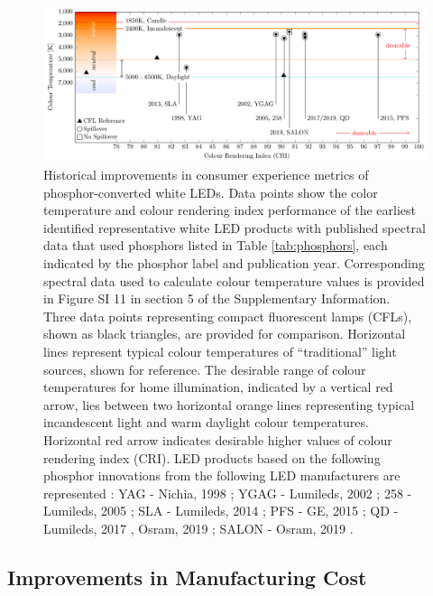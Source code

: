 \documentclass[twoside,twocolumn,9pt]{article}
\begin{document}
\begin{figure}[h!]
 \centering
 \includegraphics[width=\textwidth]{2_SSL_EES/article/figures/breakthroughs_consumer-experience.pdf}
 \caption{Historical improvements in consumer experience metrics of phosphor-converted white LEDs. Data points show the color temperature and colour rendering index performance of the earliest identified representative white LED products with published spectral data that used phosphors listed in Table \ref{tab:phosphors}, each indicated by the phosphor label and publication year. Corresponding spectral data used to calculate colour temperature values is provided in Figure SI 11 in section 5 of the Supplementary Information. Three data points representing compact fluorescent lamps (CFLs)\cite{cie_reference}, shown as black triangles, are provided for comparison. Horizontal lines represent typical colour temperatures of “traditional” light sources, shown for reference. The desirable range of colour temperatures for home illumination, indicated by a vertical red arrow, lies between two horizontal orange lines representing typical incandescent light and warm daylight colour temperatures. Horizontal red arrow indicates desirable higher values of colour rendering index (CRI). LED products based on the following phosphor innovations from the following LED manufacturers are represented : YAG - Nichia, 1998 \cite{bando1998development}; YGAG - Lumileds, 2002 \cite{Mueller2002}; 258 - Lumileds, 2005 \cite{MuellerMach2005}; SLA - Lumileds, 2014 \cite{Pust2014}; PFS - GE, 2015 \cite{Murphy2015}; QD - Lumileds, 2017 \cite{lumileds2016qd}, Osram, 2019 \cite{osram2019qd}; SALON - Osram, 2019 \cite{Hoerder2019}.}
 \label{fgr:consumer_experience}
\end{figure}

\subsection{Improvements in Manufacturing Cost}
\end{document}
